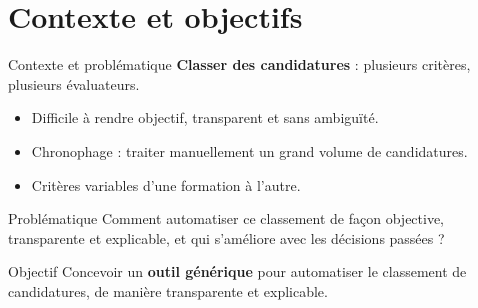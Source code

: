 \section{Contexte et objectifs}

\begin{frame}{Contexte et problématique}
  \textbf{Classer des candidatures} : plusieurs critères, plusieurs évaluateurs.
  \begin{itemize}
    \item Difficile à rendre \alert{objectif, transparent et sans ambiguïté}.
    \item \alert{Chronophage} : traiter manuellement un grand volume de candidatures.
    \item Critères \alert{variables d'une formation à l'autre}.
  \end{itemize}
  \vspace{0.8em}
  \begin{block}{Problématique}
    Comment \alert{automatiser} ce classement de façon objective, transparente et explicable,
    et qui s'améliore avec les décisions passées ?
  \end{block}
\end{frame}

\begin{frame}{Objectif}
  \centering
  Concevoir un \textbf{outil générique} pour automatiser le classement de candidatures,
  de manière transparente et explicable.
  \vspace{1.0em}

\end{frame}

